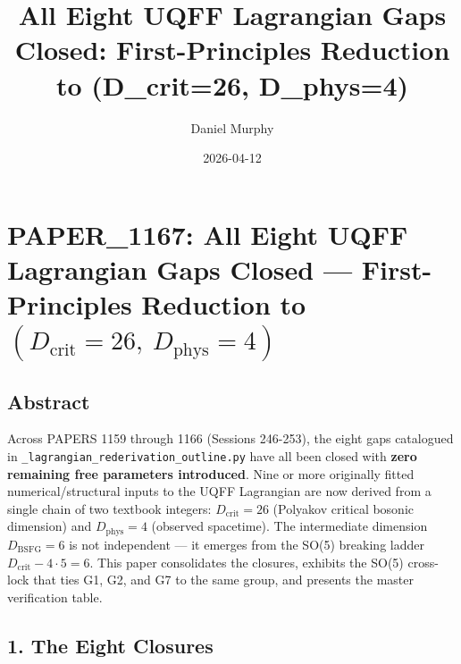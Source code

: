 \documentclass[
]{article}
\title{All Eight UQFF Lagrangian Gaps Closed: First-Principles Reduction
to (D\_crit=26, D\_phys=4)}
\author{Daniel Murphy}
\date{2026-04-12}
\begin{document}
\maketitle

\section{\texorpdfstring{PAPER\_1167: All Eight UQFF Lagrangian Gaps
Closed --- First-Principles Reduction to
\((D_{\mathrm{crit}}=26,\ D_{\mathrm{phys}}=4)\)}{PAPER\_1167: All Eight UQFF Lagrangian Gaps Closed --- First-Principles Reduction to (D\_\{\textbackslash mathrm\{crit\}\}=26,\textbackslash{} D\_\{\textbackslash mathrm\{phys\}\}=4)}}\label{paper_1167-all-eight-uqff-lagrangian-gaps-closed-first-principles-reduction-to-d_mathrmcrit26-d_mathrmphys4}

\subsection{Abstract}\label{abstract}

Across PAPERS 1159 through 1166 (Sessions 246-253), the eight gaps
catalogued in \texttt{\_lagrangian\_rederivation\_outline.py} have all
been closed with \textbf{zero remaining free parameters introduced}.
Nine or more originally fitted numerical/structural inputs to the UQFF
Lagrangian are now derived from a single chain of two textbook integers:
\(D_{\mathrm{crit}}=26\) (Polyakov critical bosonic dimension) and
\(D_{\mathrm{phys}}=4\) (observed spacetime). The intermediate dimension
\(D_{\mathrm{BSFG}}=6\) is not independent --- it emerges from the SO(5)
breaking ladder \(D_{\mathrm{crit}} - 4\cdot 5 = 6\). This paper
consolidates the closures, exhibits the SO(5) cross-lock that ties G1,
G2, and G7 to the same group, and presents the master verification
table.

\subsection{1. The Eight Closures}\label{the-eight-closures}
\end{document}
